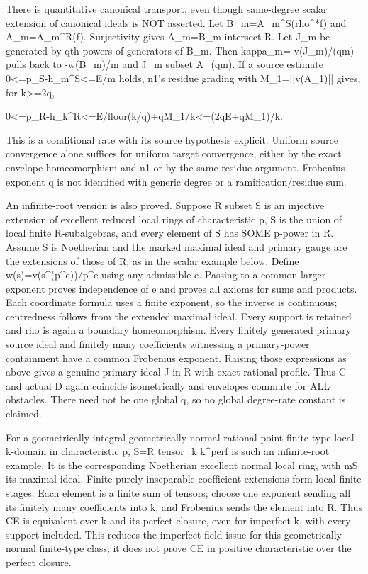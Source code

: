 \documentclass[11pt]{article}
\begin{document}
There is quantitative canonical transport, even though same-degree scalar extension of canonical ideals is NOT asserted. Let B\_m=A\_m\textasciicircum{}S(rho\textasciicircum{}*f) and A\_m=A\_m\textasciicircum{}R(f). Surjectivity gives A\_m=B\_m intersect R. Let J\_m be generated by qth powers of generators of B\_m. Then kappa\_m=-v(J\_m)/(qm) pulls back to -w(B\_m)/m and J\_m subset A\_(qm). If a source estimate 0\textless{}=p\_S-h\_m\textasciicircum{}S\textless{}=E/m holds, n1's residue grading with M\_1=||v(A\_1)|| gives, for k\textgreater{}=2q,

 0\textless{}=p\_R-h\_k\textasciicircum{}R\textless{}=E/floor(k/q)+qM\_1/k\textless{}=(2qE+qM\_1)/k.

This is a conditional rate with its source hypothesis explicit. Uniform source convergence alone suffices for uniform target convergence, either by the exact envelope homeomorphism and n1 or by the same residue argument. Frobenius exponent q is not identified with generic degree or a ramification/residue sum.

An infinite-root version is also proved. Suppose R subset S is an injective extension of excellent reduced local rings of characteristic p, S is the union of local finite R-subalgebras, and every element of S has SOME p-power in R. Assume S is Noetherian and the marked maximal ideal and primary gauge are the extensions of those of R, as in the scalar example below. Define w(s)=v(s\textasciicircum{}(p\textasciicircum{}e))/p\textasciicircum{}e using any admissible e. Passing to a common larger exponent proves independence of e and proves all axioms for sums and products. Each coordinate formula uses a finite exponent, so the inverse is continuous; centredness follows from the extended maximal ideal. Every support is retained and rho is again a boundary homeomorphism. Every finitely generated primary source ideal and finitely many coefficients witnessing a primary-power containment have a common Frobenius exponent. Raising those expressions as above gives a genuine primary ideal J in R with exact rational profile. Thus C and actual D again coincide isometrically and envelopes commute for ALL obstacles. There need not be one global q, so no global degree-rate constant is claimed.

For a geometrically integral geometrically normal rational-point finite-type local k-domain in characteristic p, S=R tensor\_k k\textasciicircum{}perf is such an infinite-root example. It is the corresponding Noetherian excellent normal local ring, with mS its maximal ideal. Finite purely inseparable coefficient extensions form local finite stages. Each element is a finite sum of tensors; choose one exponent sending all its finitely many coefficients into k, and Frobenius sends the element into R. Thus CE is equivalent over k and its perfect closure, even for imperfect k, with every support included. This reduces the imperfect-field issue for this geometrically normal finite-type class; it does not prove CE in positive characteristic over the perfect closure.
\end{document}

